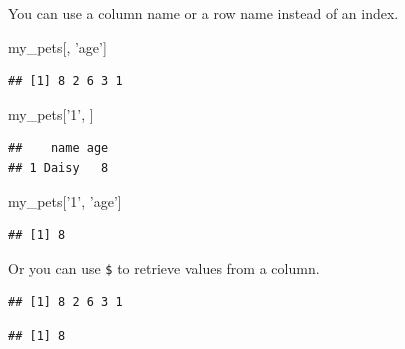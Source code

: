 \documentclass[
]{book}
\newenvironment{Shaded}{\begin{snugshade}}{\end{snugshade}}
\newcommand{\DecValTok}[1]{\textcolor[rgb]{0.00,0.00,0.81}{#1}}
\newcommand{\NormalTok}[1]{#1}
\newcommand{\OperatorTok}[1]{\textcolor[rgb]{0.81,0.36,0.00}{\textbf{#1}}}
\newcommand{\StringTok}[1]{\textcolor[rgb]{0.31,0.60,0.02}{#1}}
\begin{document}
You can use a column name or a row name instead of an index.

\begin{Shaded}
\begin{Highlighting}[]
\NormalTok{my_pets[, }\StringTok{'age'}\NormalTok{]}
\end{Highlighting}
\end{Shaded}

\begin{verbatim}
## [1] 8 2 6 3 1
\end{verbatim}

\begin{Shaded}
\begin{Highlighting}[]
\NormalTok{my_pets[}\StringTok{'1'}\NormalTok{, ]}
\end{Highlighting}
\end{Shaded}

\begin{verbatim}
##    name age
## 1 Daisy   8
\end{verbatim}

\begin{Shaded}
\begin{Highlighting}[]
\NormalTok{my_pets[}\StringTok{'1'}\NormalTok{, }\StringTok{'age'}\NormalTok{]}
\end{Highlighting}
\end{Shaded}

\begin{verbatim}
## [1] 8
\end{verbatim}

Or you can use \texttt{\$} to retrieve values from a column.

\begin{Shaded}
\end{Shaded}

\begin{verbatim}
## [1] 8 2 6 3 1
\end{verbatim}

\begin{Shaded}
\end{Shaded}

\begin{verbatim}
## [1] 8
\end{verbatim}
\end{document}
